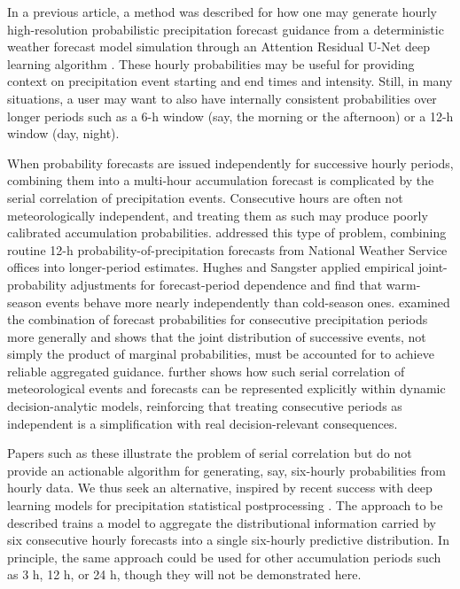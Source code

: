 \documentclass[11pt]{article}
\begin{document}
In a previous article, a method was described for how one may
generate hourly high-resolution probabilistic precipitation forecast guidance from
a deterministic weather forecast model simulation through an Attention
Residual U-Net deep learning algorithm \citep{hamill2026a}.
These hourly probabilities may be useful for providing context on precipitation event
starting and end times and intensity.  Still, in many situations, a user may want to also have internally
consistent probabilities over longer periods such as a 6-h window (say, the morning
or the afternoon) or a 12-h window (day, night).

When probability forecasts are issued
independently for successive hourly periods, combining them into a multi-hour
accumulation forecast is complicated by the serial correlation of precipitation
events.  Consecutive hours are often not meteorologically independent, and treating
them as such may produce poorly calibrated accumulation probabilities.
\citet{hughes1979} addressed this type of problem, combining
routine 12-h probability-of-precipitation forecasts from National Weather Service
offices into longer-period estimates.  Hughes and Sangster applied empirical joint-probability
adjustments for forecast-period dependence and find that warm-season events
behave more nearly independently than cold-season ones.
\citet{wilks1990} examined the combination of forecast probabilities for
consecutive precipitation periods more generally and shows that the joint
distribution of successive events, not simply the product of marginal
probabilities, must be accounted for to achieve reliable aggregated guidance.
\citet{wilks1991} further shows how such serial correlation of meteorological
events and forecasts can be represented explicitly within dynamic
decision-analytic models, reinforcing that treating consecutive periods as
independent is a simplification with real decision-relevant consequences.

Papers such as these illustrate the problem of serial correlation but do not
provide an actionable algorithm for generating, say, six-hourly probabilities
from hourly data.  We thus seek an alternative, inspired by recent success
with deep learning models for precipitation statistical postprocessing
\citep[e.g.,][]{hu2023}.
The approach to be described trains a model to aggregate the distributional information
carried by six consecutive hourly forecasts into a single six-hourly predictive
distribution.  In principle, the same approach could be used for other accumulation
periods such as 3 h, 12 h, or 24 h, though they will not be demonstrated here.
\end{document}
